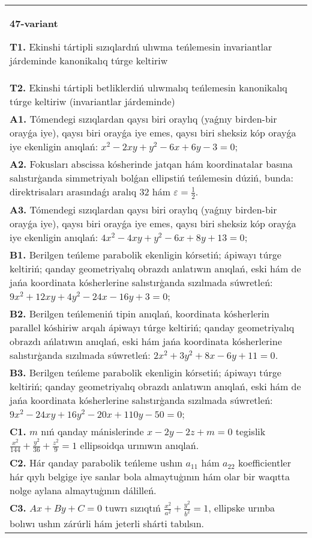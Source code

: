 \documentclass{article}
\begin{document}
\begin{tabular}{m{17cm}}
\textbf{47-variant}
\newline

\textbf{T1.} Ekinshi tártipli sızıqlardıń ulıwma teńlemesin invariantlar járdeminde kanonikalıq túrge keltiriw \\
\textbf{T2.} Ekinshi tártipli betliklerdiń ulıwmalıq teńlemesin kanonikalıq túrge keltiriw (invariantlar járdeminde) \\
\textbf{A1.} Tómendegi sızıqlardan qaysı biri oraylıq (yaǵnıy birden-bir orayǵa iye), qaysı biri orayǵa iye emes, qaysı biri sheksiz kóp orayǵa iye ekenligin anıqlań:  $x^2-2 x y+y^2-6 x+6 y-3=0$; \\
\textbf{A2.} Fokusları abscissa kósherinde jatqan hám koordinatalar basına salıstırģanda simmetriyalı bolǵan ellipstiń teńlemesin dúziń, bunda: direktrisaları arasındaǵı aralıq 32 hám $\varepsilon=\frac{1}{2}$. \\
\textbf{A3.} Tómendegi sızıqlardan qaysı biri oraylıq (yaǵnıy birden-bir orayǵa iye), qaysı biri orayǵa iye emes, qaysı biri sheksiz kóp orayǵa iye ekenligin anıqlań: $4 x^2-4 x y+y^2-6 x+8 y+13=0$; \\
\textbf{B1.} Berilgen teńleme parabolik ekenligin kórsetiń; ápiwayı túrge keltiriń; qanday geometriyalıq obrazdı anlatıwın anıqlań, eski hám de jańa koordinata kósherlerine salıstırģanda sızılmada súwretleń:$9 x^2+12 x y+4 y^2-24 x-16 y+3=0$; \\
\textbf{B2.} Berilgen teńlemeniń tipin anıqlań, koordinata kósherlerin parallel kóshiriw arqalı ápiwayı túrge keltiriń; qanday geometriyalıq obrazdı ańlatıwın anıqlań, eski hám jańa koordinata kósherlerine salıstırģanda sızılmada súwretleń: $2 x^2+3 y^2+8 x-6 y+11=0$. \\
\textbf{B3.} Berilgen teńleme parabolik ekenligin kórsetiń; ápiwayı túrge keltiriń; qanday geometriyalıq obrazdı anlatıwın anıqlań, eski hám de jańa koordinata kósherlerine salıstırģanda sızılmada súwretleń:$9 x^2-24 x y+16 y^2-20 x+110 y-50=0$; \\
\textbf{C1.} $m$ nıń qanday mánislerinde $x-2 y-2 z+m=0$ tegislik $\frac{x^2}{144}+\frac{y^2}{36}+\frac{z^2}{9}=1$ ellipsoidqa urınıwın anıqlań. \\
\textbf{C2.} Hár qanday parabolik teńleme ushın $a_{11}$ hám $a_{22}$ koefficientler hár qıylı belgige iye sanlar bola almaytuģının hám olar bir waqıtta nolge aylana almaytuģının dálilleń. \\
\textbf{C3.} $A x+B y+C=0$ tuwrı sızıqtıń $\frac{x^2}{a^2}+\frac{y^2}{b^2}=1$, ellipske urınba bolıwı ushın zárúrli hám jeterli shárti tabılsın. \\

\end{tabular}
\vspace{1cm}
\end{document}
